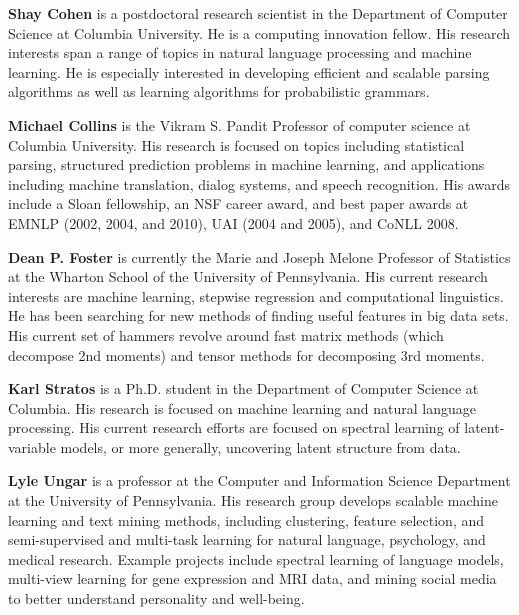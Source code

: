 \begin{bio}
\setlength{\parskip}{1ex}

\noindent
{\bfseries Shay Cohen} is a postdoctoral research scientist in the Department of Computer Science at Columbia University. He is a computing innovation fellow. His research interests span a range of topics in natural language processing and machine learning. He is especially interested in developing efficient and scalable parsing algorithms as well as learning algorithms for probabilistic grammars.

{\bfseries Michael Collins} is the Vikram S. Pandit Professor of computer science at Columbia University. His research is focused on topics including statistical parsing, structured prediction problems in machine learning, and applications including machine translation, dialog systems, and speech recognition. His awards include a Sloan fellowship, an NSF career award, and best paper awards at EMNLP (2002, 2004, and 2010), UAI (2004 and 2005), and CoNLL 2008.

{\bfseries Dean P. Foster} is currently the Marie and Joseph Melone Professor of Statistics at the Wharton School of the University of Pennsylvania. His current research interests are machine learning, stepwise regression and computational linguistics. He has been searching for new methods of finding useful features in big data sets. His current set of hammers revolve around fast matrix methods (which decompose 2nd moments) and tensor methods for decomposing 3rd moments.

{\bfseries Karl Stratos} is a Ph.D. student in the Department of Computer Science at Columbia. His research is focused on machine learning and natural language processing. His current research efforts are focused on spectral learning of latent-variable models, or more generally, uncovering latent structure from data.

{\bfseries Lyle Ungar} is a professor at the Computer and Information Science Department at the University of Pennsylvania. His research group develops scalable machine learning and text mining methods, including clustering, feature selection, and semi-supervised and multi-task learning for natural language, psychology, and medical research. Example projects include spectral learning of language models, multi-view learning for gene expression and MRI data, and mining social media to better understand personality and well-being.
\end{bio}


